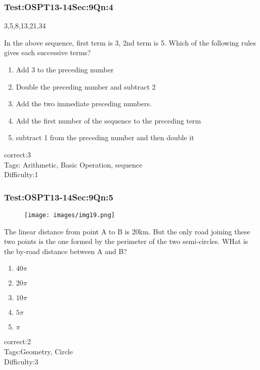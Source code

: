 \documentclass[]{beamer}
\begin{document}
    \begin{frame}
	    \frametitle{Test:OSPT13-14\hspace{2mm}Sec:9\hspace{2mm}Qn:4}
	    \begin{center}
	     3,5,8,13,21,34
	    \end{center}
	    In the above sequence, first term is 3, 2nd term is 5. Which of the following rules gives each successive terms?
	   \begin{enumerate}
	        \item
	           Add 3 to the preceding number
	        \item
	           Double the preceding number and subtract 2 
	        \item
	           Add the two immediate preceding numbers.
	        \item
	           Add the first number of the sequence to the preceding term
	        \item
	           subtract 1 from the preceding number and then double it
	    \end{enumerate}
	    correct:3\\   
	    Tags: Arithmetic, Basic Operation, sequence\\
	    Difficulty:1   \\
    \end{frame}    
    \begin{frame}
	    \frametitle{Test:OSPT13-14\hspace{2mm}Sec:9\hspace{2mm}Qn:5}
	    \begin{figure}
	    \begin{center}
	    \texttt{[image: images/img19.png]}
	    \end{center}
	    \end{figure}
	    The linear distance from point A to B is 20km. But the only road joining these two points is the one formed by the perimeter of the two semi-circles. WHat is the by-road distance between A and B?
	   \begin{enumerate}
	        \item
	           $40\pi$
	        \item
	            $20\pi$
	        \item
	           $10\pi$
	        \item
	            $5\pi$
	        \item
	            $\pi$
	    \end{enumerate}
	    correct:2\\   
	    Tags:Geometry, Circle \\
	    Difficulty:3   \\
    \end{frame}    
\end{document}

